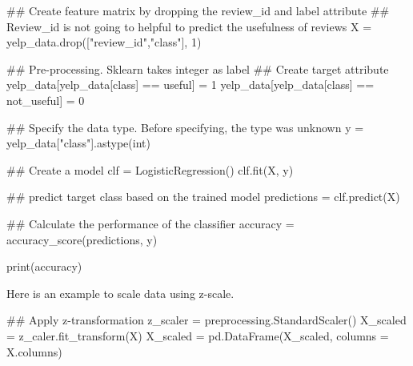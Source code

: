\documentclass[
  letterpaper,
]{scrbook}
\newenvironment{Shaded}{\begin{snugshade}}{\end{snugshade}}
\newcommand{\BuiltInTok}[1]{\textcolor[rgb]{0.00,0.23,0.31}{#1}}
\newcommand{\CommentTok}[1]{\textcolor[rgb]{0.37,0.37,0.37}{#1}}
\newcommand{\DecValTok}[1]{\textcolor[rgb]{0.68,0.00,0.00}{#1}}
\newcommand{\NormalTok}[1]{\textcolor[rgb]{0.00,0.23,0.31}{#1}}
\newcommand{\OperatorTok}[1]{\textcolor[rgb]{0.37,0.37,0.37}{#1}}
\newcommand{\StringTok}[1]{\textcolor[rgb]{0.13,0.47,0.30}{#1}}
\begin{document}
\begin{Shaded}
\begin{Highlighting}[]
\CommentTok{\#\# Create feature matrix by dropping the review\_id and label attribute}
\CommentTok{\#\# Review\_id is not going to helpful to predict the usefulness of reviews}
\NormalTok{X }\OperatorTok{=}\NormalTok{ yelp\_data.drop([}\StringTok{"review\_id"}\NormalTok{,}\StringTok{"class"}\NormalTok{], }\DecValTok{1}\NormalTok{)    }

\CommentTok{\#\# Pre{-}processing. Sklearn takes integer as label}
\CommentTok{\#\# Create target attribute}
\NormalTok{yelp\_data[yelp\_data[}\StringTok{\textquotesingle{}class\textquotesingle{}}\NormalTok{] }\OperatorTok{==} \StringTok{\textquotesingle{}useful\textquotesingle{}}\NormalTok{] }\OperatorTok{=} \DecValTok{1}
\NormalTok{yelp\_data[yelp\_data[}\StringTok{\textquotesingle{}class\textquotesingle{}}\NormalTok{] }\OperatorTok{==} \StringTok{\textquotesingle{}not\_useful\textquotesingle{}}\NormalTok{] }\OperatorTok{=} \DecValTok{0}

\CommentTok{\#\# Specify the data type. Before specifying, the type was unknown}
\NormalTok{y }\OperatorTok{=}\NormalTok{ yelp\_data[}\StringTok{"class"}\NormalTok{].astype(}\StringTok{\textquotesingle{}int\textquotesingle{}}\NormalTok{)}

\CommentTok{\#\# Create a model}
\NormalTok{clf }\OperatorTok{=}\NormalTok{ LogisticRegression()}
\NormalTok{clf.fit(X, y)}

\CommentTok{\#\# predict target class based on the trained model }
\NormalTok{predictions }\OperatorTok{=}\NormalTok{ clf.predict(X)}

\CommentTok{\#\# Calculate the performance of the classifier}
\NormalTok{accuracy }\OperatorTok{=}\NormalTok{ accuracy\_score(predictions, y)}

\BuiltInTok{print}\NormalTok{(accuracy)}
\end{Highlighting}
\end{Shaded}

Here is an example to scale data using z-scale.

\begin{Shaded}
\begin{Highlighting}[]
\CommentTok{\#\# Apply z{-}transformation}
\NormalTok{z\_scaler }\OperatorTok{=}\NormalTok{ preprocessing.StandardScaler()}
\NormalTok{X\_scaled }\OperatorTok{=}\NormalTok{ z\_caler.fit\_transform(X)}
\NormalTok{X\_scaled }\OperatorTok{=}\NormalTok{ pd.DataFrame(X\_scaled, columns }\OperatorTok{=}\NormalTok{ X.columns)}
\end{Highlighting}
\end{Shaded}
\end{document}
